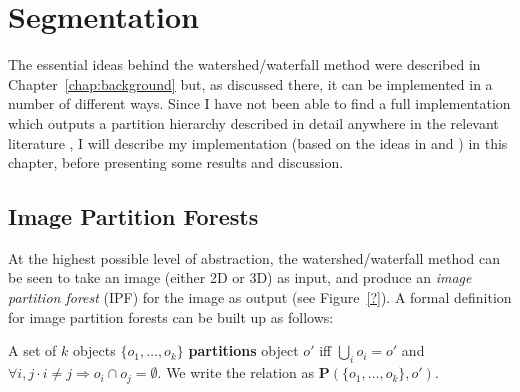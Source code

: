\chapter{Segmentation}
\label{chap:segmentation}

\iffalse

- Quick summary of watershed/waterfall methods from Chapter 2
- Explanation that this chapter will extend the original explanation to include image partition forests + definition of them
- Overview of the implementation algorithms used (incl. the preprocessing necessary)
- Detailed implementation of the preprocessing steps
- Detailed implementation of the watershed transform (reference original paper)
- Detailed implementation of the waterfall algorithm (reference original paper)
- Demonstration that the produced segmentations are generally good, whilst showing that they aren't always
- Discussion of factors affecting the segmentation (CT window, image resolution and quality, etc.)
- 3D visualizations to illustrate that good results can be obtained through automatic segmentation followed by manual feature identification (explain user interface)

\fi

The essential ideas behind the watershed/waterfall method were described in Chapter~\ref{chap:background} but, as discussed there, it can be implemented in a number of different ways. Since I have not been able to find a full implementation which outputs a partition hierarchy described in detail anywhere in the relevant literature \cite{?}, I will describe my implementation (based on the ideas in \cite{meijster98} and \cite{marcotegui05}) in this chapter, before presenting some results and discussion.

\section{Image Partition Forests}

At the highest possible level of abstraction, the watershed/waterfall method can be seen to take an image (either 2D or 3D) as input, and produce an \emph{image partition forest} (IPF) for the image as output (see Figure~\ref{?}). A formal definition for image partition forests can be built up as follows:

\begin{definition}
A set of $k$ objects $\{o_1,\ldots,o_k\}$ \textbf{partitions} object $o'$ iff $\bigcup_i o_i = o'$ and $\forall i,j \cdot i \ne j \Rightarrow o_i \cap o_j = \emptyset$. We write the relation as $\mathbf{P}(\{o_1,\ldots,o_k\},o')$.
\end{definition}

